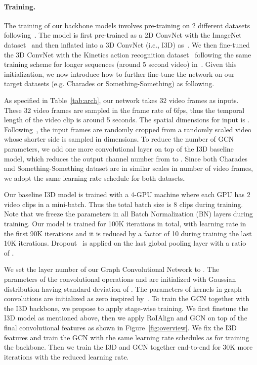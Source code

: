 \documentclass[runningheads]{llncs}
\begin{document}
\paragraph{Training.} The training of our backbone models involves pre-training on 2 different datasets following~\cite{xiaolongwang2017nonlocal,Carreira2017}. The model is first pre-trained as a 2D ConvNet with the  ImageNet dataset~\cite{Russakovsky2015} and then inflated into a 3D ConvNet (i.e., I3D) as~\cite{Carreira2017}. We then fine-tuned the 3D ConvNet with the Kinetics action recognition dataset~\cite{Kay2017} following the same training scheme for longer sequences (around 5 second video) in~\cite{xiaolongwang2017nonlocal}. Given this initialization, we now introduce how to further fine-tune the network on our target datasets (e.g. Charades or Something-Something) as following. 

As specified in Table~\ref{tab:arch}, our network takes 32 video frames as inputs. These 32 video frames are sampled in the frame rate of 6fps, thus the temporal length of the video clip is around 5 seconds. The spatial dimensions for input is . Following~\cite{Simonyan2015}, the input frames are randomly cropped from a randomly scaled video whose shorter side is sampled in  dimensions. To reduce the number of GCN parameters, we add one more  convolutional layer on top of the I3D  baseline model, which reduces the output channel number from  to . Since both Charades and Something-Something dataset are in similar scales in number of video frames, we adopt the same learning rate schedule for both datasets. 

Our baseline I3D model is trained with a 4-GPU machine where each GPU has 2 video clips in a mini-batch. Thus the total batch size is 8 clips during training. Note that we freeze the parameters in all Batch Normalization (BN) layers during training. Our model is trained for 100K iterations in total, with learning rate  in the first 90K iterations and it is reduced by a factor of 10 during training the last 10K iterations. Dropout~\cite{Hinton2012} is applied on the last global pooling layer with a ratio of . 

We set the layer number of our Graph Convolutional Network to . The parameters of the convolutional operations  and  are initialized with Gaussian distribution having standard deviation of . The parameters of kernels in graph convolutions  are initialized  as zero inspired by~\cite{Goyal2017}. To train the GCN together with the I3D backbone, we propose to apply stage-wise training. We first finetune the I3D model as mentioned above, then we apply RoIAlign and GCN on top of the final convolutional features as shown in Figure~\ref{fig:overview}. We fix the I3D features and train the GCN with the same learning rate schedules as for training the backbone. Then we train the I3D and GCN together end-to-end for 30K more iterations with the reduced learning rate. 
\end{document}
